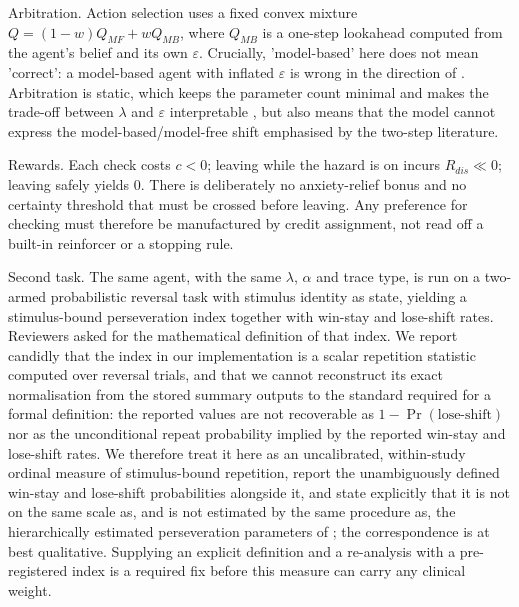 \documentclass[11pt,a4paper]{article}
\begin{document}
Arbitration. Action selection uses a fixed convex mixture $Q = (1-w) Q_{MF} + w Q_{MB}$, where $Q_{MB}$ is a one-step lookahead computed from the agent's belief and its own $\varepsilon$. Crucially, 'model-based' here does not mean 'correct': a model-based agent with inflated $\varepsilon$ is wrong in the direction of \citet{fradkin2020searching}. Arbitration is static, which keeps the parameter count minimal and makes the trade-off between $\lambda$ and $\varepsilon$ interpretable \citep{moerland2023modelbased}, but also means that the model cannot express the model-based/model-free shift emphasised by the two-step literature.

Rewards. Each check costs $c<0$; leaving while the hazard is on incurs $R_{dis} \ll 0$; leaving safely yields $0$. There is deliberately no anxiety-relief bonus and no certainty threshold that must be crossed before leaving. Any preference for checking must therefore be manufactured by credit assignment, not read off a built-in reinforcer or a stopping rule.

Second task. The same agent, with the same $\lambda$, $\alpha$ and trace type, is run on a two-armed probabilistic reversal task with stimulus identity as state, yielding a stimulus-bound perseveration index together with win-stay and lose-shift rates. Reviewers asked for the mathematical definition of that index. We report candidly that the index in our implementation is a scalar repetition statistic computed over reversal trials, and that we cannot reconstruct its exact normalisation from the stored summary outputs to the standard required for a formal definition: the reported values are not recoverable as $1-\Pr(\text{lose-shift})$ nor as the unconditional repeat probability implied by the reported win-stay and lose-shift rates. We therefore treat it here as an uncalibrated, within-study ordinal measure of stimulus-bound repetition, report the unambiguously defined win-stay and lose-shift probabilities alongside it, and state explicitly that it is not on the same scale as, and is not estimated by the same procedure as, the hierarchically estimated perseveration parameters of \citet{kanen2019computational}; the correspondence is at best qualitative. Supplying an explicit definition and a re-analysis with a pre-registered index is a required fix before this measure can carry any clinical weight.
\end{document}
